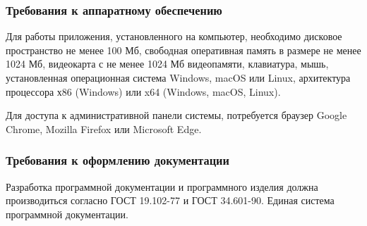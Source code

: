 \subsubsection{Требования к аппаратному обеспечению}
Для работы приложения, установленного на компьютер, необходимо дисковое пространство не менее 100 Мб, свободная оперативная память в размере не менее 1024 Мб, видеокарта с не менее 1024 Мб видеопамяти, клавиатура, мышь, установленная операционная система Windows, macOS или Linux, архитектура процессора х86 (Windows) или x64 (Windows, macOS, Linux). 

Для доступа к административной панели системы, потребуется браузер Google Chrome, Mozilla Firefox или Microsoft Edge.

\subsubsection{Требования к оформлению документации}
Разработка программной документации и программного изделия должна производиться согласно ГОСТ 19.102-77 и ГОСТ 34.601-90. Единая система программной документации.
